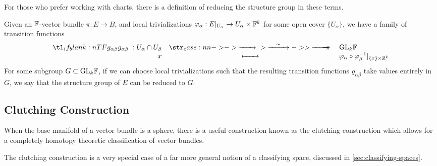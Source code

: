 \begin{remark}
	For those who prefer working with charts, there is a definition of reducing the structure group in these terms.

	Given an $\mathbb{F}$-vector bundle $\pi : E \to B$, and local trivializations $\varphi_\alpha : E|_{U_\alpha} \to U_{\alpha}\times \mathbb{F}^k$ for some open cover $\{U_\alpha\}$, we have a family of transition functions
	\[
		\lkxfunc{g_{\alpha\beta}}{U_\alpha\cap U_\beta}{\GL_k \F}{x}{\varphi_\alpha\circ \varphi_{\beta}^{-1}|_{\{x\}\times \R^k}}
	\]
	For some subgroup $G\subset \mathrm{GL}_k\mathbb{F}$, if we can choose local trivializations such that the resulting transition functions $g_{\alpha\beta}$ take values entirely in $G$, we say that the structure group of $E$ can be reduced to $G$.
\end{remark}

\begin{remark}
\end{remark}

\subsection{Clutching Construction}\label{sec:clutching-construction}

When the base manifold of a vector bundle is a sphere, there is a useful construction known as the clutching construction which allows for a completely homotopy theoretic classification of vector bundles.

\begin{remark} The clutching construction is a very special case of a far more general notion of a classifying space, discussed in \cref{sec:classifying-spaces}.
\end{remark}

